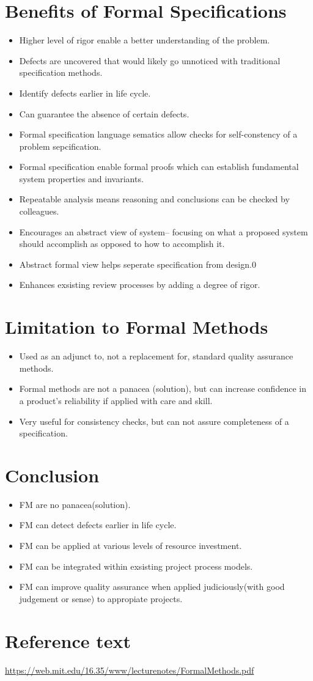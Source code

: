 \documentclass{article}
\begin{document}
    \section{Benefits of Formal Specifications}
    \begin{itemize}
        \item Higher level of rigor enable a better understanding of the problem.
        \item Defects are uncovered that would likely go unnoticed with traditional specification methods.
        \item Identify defects earlier in life cycle.
        \item Can guarantee the absence of certain defects. 
        \item Formal specification language sematics allow checks for self-constency of a problem sepcification.
        \item Formal specification enable formal proofs which can establish fundamental system properties and invariants.
        \item Repeatable analysis means reasoning and conclusions can be checked by colleagues.
        \item Encourages an abstract view of system-- focusing on what a proposed system should accomplish as opposed to how to accomplish it.
        \item Abstract formal view helps seperate specification from design.0
        \item Enhances exsisting review processes by adding a degree of rigor.
    \end{itemize}
    \section{Limitation to Formal Methods}
    \begin{itemize}
        \item Used as an adjunct to, not a replacement for, standard quality assurance methods.
        \item Formal methods are not a panacea (solution), but can increase confidence in a product's reliability if applied with care and skill.
        \item Very useful for consistency checks, but can not assure completeness of a specification. 
    \end{itemize}
    \section{Conclusion}
    \begin{itemize}
        \item FM are no panacea(solution).
        \item FM can detect defects earlier in life cycle.
        \item FM can be applied at various levels of resource investment.
        \item FM can be integrated within exsisting project process models.
        \item FM can improve quality assurance when applied judiciously(with good judgement or sense) to appropiate projects.
    \end{itemize}
    \section{Reference text}
    \href{https://web.mit.edu/16.35/www/lecturenotes/FormalMethods.pdf}{https://web.mit.edu/16.35/www/lecturenotes/FormalMethods.pdf}
\end{document}
